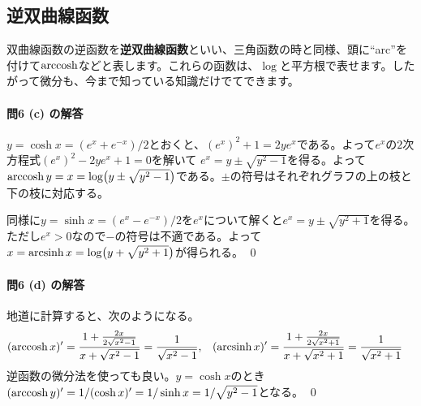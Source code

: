 \subsection{逆双曲線函数}

双曲線函数の逆函数を\textbf{逆双曲線函数}といい、三角函数の時と同様、頭に``arc''を付けて$\operatorname{arccosh}$などと表します。これらの函数は、$\log$と平方根で表せます。したがって微分も、今まで知っている知識だけでてできます。

\paragraph{問6 (c) の解答}

$y=\cosh x = (e^x+e^{-x})/2$とおくと、$(e^x)^2 + 1 = 2ye^x$である。よって$e^x$の$2$次方程式$(e^x)^2 - 2y e^x+1=0$を解いて
$e^x = y\pm\sqrt{y^2-1}$を得る。よって$\operatorname{arccosh} y = x = \log\bigl(y\pm\sqrt{y^2-1}\bigr)$である。$\pm$の符号はそれぞれグラフの上の枝と下の枝に対応する。

同様に$y=\sinh x = (e^x - e^{-x})/2$を$e^x$について解くと$e^x=y\pm\sqrt{y^2+1}$を得る。ただし$e^x>0$なので$-$の符号は不適である。よって$x=\operatorname{arcsinh} x=\log\bigl(y+\sqrt{y^2+1}\bigr)$が得られる。 \qed

\paragraph{問6 (d) の解答} 地道に計算すると、次のようになる。
\begin{align*}
(\operatorname{arccosh} x)' &= \frac{1+\frac{2x}{2\sqrt{x^2-1}}}{x+\sqrt{x^2-1}} = \frac{1}{\sqrt{x^2-1}}, &
(\operatorname{arcsinh} x)' &= \frac{1+\frac{2x}{2\sqrt{x^2+1}}}{x+\sqrt{x^2+1}} = \frac{1}{\sqrt{x^2+1}}
\end{align*}
逆函数の微分法を使っても良い。$y=\cosh x$のとき$(\operatorname{arccosh} y)' = 1 / (\cosh x)' = 1 / \sinh x = 1 / \sqrt{y^2-1}$となる。 \qed


